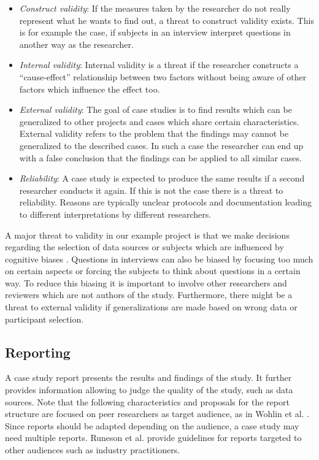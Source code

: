 \documentclass[runningheads]{llncs}
\begin{document}
\begin{itemize}
	\item \textit{Construct validity}: If the measures taken by the researcher do not really represent what he wants to find out, a threat to construct validity exists. This is for example the case, if subjects in an interview interpret questions in another way as the researcher.
	\item \textit{Internal validity}: Internal validity is a threat if the researcher constructs a ``cause-effect'' relationship between two factors without being aware of other factors which influence the effect too.
	\item \textit{External validity}: The goal of case studies is to find results which can be generalized to other projects and cases which share certain characteristics. External validity refers to the problem that the findings may cannot be generalized to the described cases. In such a case the researcher can end up with a false conclusion that the findings can be applied to all similar cases.
	\item \textit{Reliability}: A case study is expected to produce the same results if a second researcher conducts it again. If this is not the case there is a threat to reliability. Reasons are typically unclear protocols and documentation leading to different interpretations by different researchers.
\end{itemize}

A major threat to validity in our example project is that we make decisions regarding the selection of data sources or subjects which are influenced by cognitive biases \cite{Tversky1975}. Questions in interviews can also be biased by focusing too much on certain aspects or forcing the subjects to think about questions in a certain way. To reduce this biasing it is important to involve other researchers and reviewers which are not authors of the study. Furthermore, there might be a threat to external validity if generalizations are made based on wrong data or participant selection. 

\subsection{Reporting}
A case study report presents the results and findings of the study. It further provides information allowing to judge the quality of the study, such as data sources. Note that the following characteristics and proposals for the report structure are focused on peer researchers as target audience, as in Wohlin et al. \cite{Wohlin:2012:ESE:2349018}. Since reports should be adapted depending on the audience, a case study may need multiple reports. Runeson et al. \cite{Runeson:2012:CSR:2361717} provide guidelines for reports targeted to other audiences such as industry practitioners. 
\end{document}
